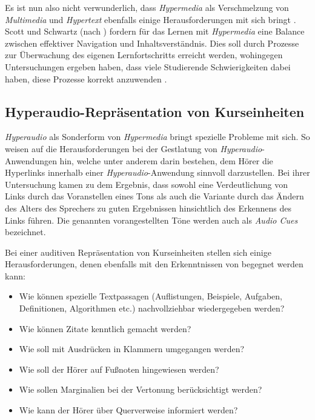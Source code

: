 Es ist nun also nicht verwunderlich, dass \textit{Hypermedia} als Verschmelzung von \textit{Multimedia} und \textit{Hypertext} ebenfalls einige Herausforderungen mit sich bringt \citep{moos2010multimedia}. Scott und Schwartz (nach \cite{moos2010multimedia}) fordern für das Lernen mit \textit{Hypermedia} eine Balance zwischen effektiver Navigation und Inhaltsverständnis. Dies soll durch Prozesse zur Überwachung des eigenen Lernfortschritts erreicht werden, wohingegen Untersuchungen ergeben haben, dass viele Studierende Schwierigkeiten dabei haben, diese Prozesse korrekt anzuwenden \citep{moos2010multimedia}.


\subsection{Hyperaudio-Repräsentation von Kurseinheiten}
\label{sec:hyperaudio}
\label{sec:audiocues}
\textit{Hyperaudio} als Sonderform von \textit{Hypermedia} bringt spezielle Probleme mit sich. So weisen \cite{donker2007gestaltung} auf die Herausforderungen bei der Gestlatung von \textit{Hyperaudio}-Anwendungen hin, welche unter anderem darin bestehen, dem Hörer die Hyperlinks innerhalb einer \textit{Hyperaudio}-Anwendung sinnvoll darzustellen. Bei ihrer Untersuchung kamen \cite{donker2007gestaltung} zu dem Ergebnis, \glqq dass sowohl eine Verdeutlichung von Links durch das Voranstellen eines Tons als auch die Variante durch das
Ändern des Alters des Sprechers zu guten Ergebnissen hinsichtlich des Erkennens des Links
führen.\grqq{} Die genannten vorangestellten Töne werden auch als \textit{Audio Cues} bezeichnet.

Bei einer auditiven Repräsentation von Kurseinheiten stellen sich einige Herausforderungen, denen ebenfalls mit den Erkenntnissen von \cite{donker2007gestaltung} begegnet werden kann:

\begin{itemize}
\item Wie können spezielle Textpassagen (Auflistungen, Beispiele, Aufgaben, Definitionen, Algorithmen etc.) nachvollziehbar wiedergegeben werden?
\item Wie können Zitate kenntlich gemacht werden?
\item Wie soll mit Ausdrücken in Klammern umgegangen werden?
\item Wie soll der Hörer auf Fußnoten hingewiesen werden?
\item Wie sollen Marginalien bei der Vertonung berücksichtigt werden?
\item Wie kann der Hörer über Querverweise informiert werden?
\end{itemize} 

